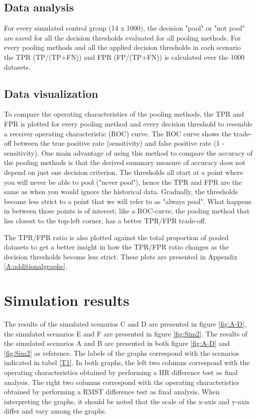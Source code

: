 \documentclass[Royal,sagev,times]{sagej}
\begin{document}
\subsection{Data analysis}
For every simulated control group (14 x 1000), the decision "pool" or "not pool" are saved for all the decision thresholds evaluated for all pooling methods. For every pooling methods and all the applied decision thresholds in each scenario the TPR (TP/(TP+FN)) and FPR (FP/(TP+FN)) is calculated over the 1000 datasets.\cite{hajian2013} 

\subsection{Data visualization}
To compare the operating characteristics of the pooling methods, the TPR and FPR is plotted for every pooling method and every decision threshold to resemble a receiver operating characteristic (ROC) curve. The ROC curve shows the trade-off between the true positive rate (sensitivity) and false positive rate (1 - sensitivity).\cite{hajian2013} One main advantage of using this method to compare the accuracy of the pooling methods is that the derived summary measure of accuracy does not depend on just one decision criterion.\cite{hajian2013} 
The thresholds all start at a point where you will never be able to pool ("never pool"), hence the TPR and FPR are the same as when you would ignore the historical data. Gradually, the thresholds become less strict to a point that we will refer to as "always pool". What happens in between those points is of interest; like a ROC-curve, the pooling method that lies closest to the top-left corner, has a better TPR/FPR trade-off. 

The TPR/FPR ratio is also plotted against the total proportion of pooled datasets to get a better insight in how the TPR/FPR ratio changes as the decision thresholds become less strict. These plots are presented in Appendix \ref{A:additionalgraphs}.

\section{Simulation results}
The results of the simulated scenarios C and D are presented in figure \ref{fig:A-D}, the simulated scenarios E and F are presented in figure \ref{fig:Sim2}. The results of the simulated scenarios A and B are presented in both figure \ref{fig:A-D} and \ref{fig:Sim2} as reference. The labels of the graphs correspond with the scenarios indicated in tabel \ref{T1}. In both graphs, the left two columns correspond with the operating characteristics obtained by performing a HR difference test as final analysis. The right two columns correspond with the operating characteristics obtained by performing a RMST difference test as final analysis. When interpreting the graphs, it should be noted that the scale of the x-axis and y-axis differ and vary among the graphs.
\end{document}
